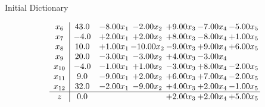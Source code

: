 \documentclass[8pt]{article}
\begin{document}
Initial Dictionary 

\[\begin{array}{c| c c@{\hskip 2pt} c@{\hskip 2pt} c@{\hskip 2pt} c@{\hskip 2pt} c@{\hskip 2pt} }
 x_{6}   &  43.0 & -8.00 x_{1} & -2.00 x_{2} & +  9.00 x_{3} & -7.00 x_{4} & -5.00 x_{5}\\
 x_{7}   &  -4.0 & +  2.00 x_{1} & +  2.00 x_{2} & +  8.00 x_{3} & -8.00 x_{4} & +  1.00 x_{5}\\
 x_{8}   &  10.0 & +  1.00 x_{1} & -10.00 x_{2} & -9.00 x_{3} & +  9.00 x_{4} & +  6.00 x_{5}\\
 x_{9}   &  20.0 & -3.00 x_{1} & -3.00 x_{2} & +  4.00 x_{3} & -3.00 x_{4} &   \\
 x_{10}   &  -4.0 & -1.00 x_{1} & +  1.00 x_{2} & -3.00 x_{3} & +  8.00 x_{4} & -2.00 x_{5}\\
 x_{11}   &  9.0 & -9.00 x_{1} & +  2.00 x_{2} & +  6.00 x_{3} & +  7.00 x_{4} & -2.00 x_{5}\\
 x_{12}   &  32.0 & -2.00 x_{1} & -9.00 x_{2} & +  4.00 x_{3} & +  2.00 x_{4} & -1.00 x_{5}\\
\hline
z    &  0.0  &    &   & +  2.00 x_{3} & +  2.00 x_{4} & +  5.00 x_{5}\\
\end{array}\]
\end{document}
